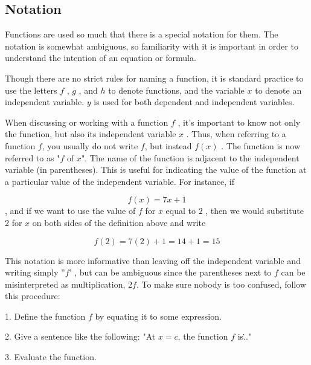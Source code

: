 \subsection{Notation}
\label{sss:nota-71f9}




Functions are used so much that there is a special notation for them. The notation is
somewhat ambiguous, so familiarity with it is important in order to understand the
intention of an equation or formula.



Though there are no strict rules for naming a function, it is standard practice to use the
letters $f$ , $g$ , and $h$ to denote functions, and the variable $x$ to denote an
independent variable. $y$ is used for both dependent and independent variables.



When discussing or working with a function $f$ , it's important to know not only the
function, but also its independent variable $x$ . Thus, when referring to a function $f$,
you usually do not write $f$, but instead $f(x)$ . The function is now referred to as "$f$
of $x$". The name of the function is adjacent to the independent variable (in
parentheses). This is useful for indicating the value of the function at a particular
value of the independent variable. For instance, if



$$f(x)=7x+1$$ , and if we want to use the value of $f$ for $x$ equal to $2$ , then we
would substitute 2 for $x$ on both sides of the definition above and write



$$f(2)=7(2)+1=14+1=15$$



This notation is more informative than leaving off the independent variable and writing
simply ''$f$' , but can be ambiguous since the parentheses next to $f$ can be
misinterpreted as multiplication, $2f$. To make sure nobody is too confused, follow this
procedure:



1.  Define the function $f$ by equating it to some expression.

2.  Give a sentence like the following: "At $x=c$, the function $f$ is\..."

3.  Evaluate the function.




